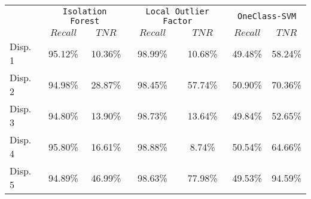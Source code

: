 \begin{tabular}{lcccccc}
    \toprule
     & \multicolumn{2}{c}{\texttt{Isolation Forest}} & \multicolumn{2}{c}{\texttt{Local Outlier Factor}} & \multicolumn{2}{c}{\texttt{OneClass-SVM}} \\
    \cmidrule(lr){2-3}\cmidrule(lr){4-5}\cmidrule(lr){6-7}
    & $Recall$ & $TNR$ & $Recall$ & $TNR$ & $Recall$ & $TNR$ \\
    \midrule
     Disp. 1 & 95.12\% & 10.36\% & 98.99\% & 10.68\% & 49.48\% & 58.24\% \\
     Disp. 2 & 94.98\% & 28.87\% & 98.45\% & 57.74\% & 50.90\% & 70.36\% \\
     Disp. 3 & 94.80\% & 13.90\% & 98.73\% & 13.64\% & 49.84\% & 52.65\% \\
     Disp. 4 & 95.80\% & 16.61\% & 98.88\% & 8.74\% & 50.54\% & 64.66\% \\
     Disp. 5 & 94.89\% & 46.99\% & 98.63\% & 77.98\% & 49.53\% & 94.59\% \\
    \bottomrule
\end{tabular}
